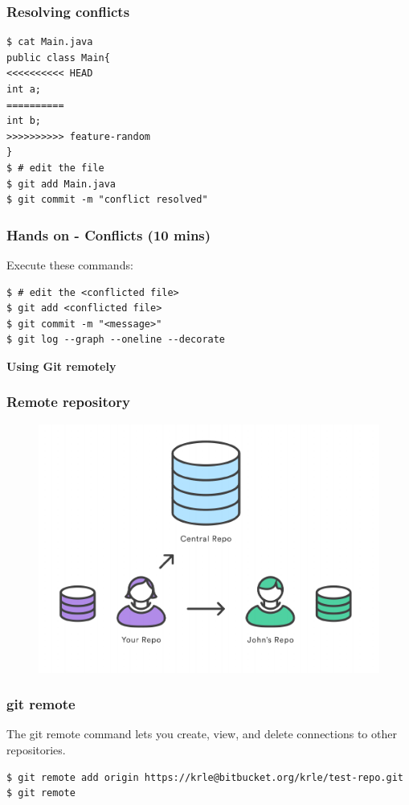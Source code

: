 \documentclass{beamer}
\begin{document}
\begin{frame}[fragile]
\frametitle{Resolving conflicts}
\begin{lstlisting}
$ cat Main.java
public class Main{
<<<<<<<<<< HEAD
int a;
==========
int b;
>>>>>>>>>> feature-random
}
$ # edit the file
$ git add Main.java
$ git commit -m "conflict resolved"
\end{lstlisting}

\end{frame}

\begin{frame}[fragile]
\frametitle{Hands on - Conflicts (10 mins)}

Execute these commands:

\begin{lstlisting}
$ # edit the <conflicted file>
$ git add <conflicted file>
$ git commit -m "<message>"
$ git log --graph --oneline --decorate
\end{lstlisting}
\end{frame}


\begin{frame}
\LARGE	
\textbf{Using Git remotely}
\end{frame}

\begin{frame}
\frametitle{Remote repository}

\begin{figure}
\includegraphics[scale=0.6]{figures/06.pdf}
\end{figure}

\end{frame}


\begin{frame}[fragile]
\frametitle{git remote}

The git remote command lets you create, view, and delete connections
to other repositories.

\begin{lstlisting}
$ git remote add origin https://krle@bitbucket.org/krle/test-repo.git
$ git remote
\end{lstlisting}
\end{frame}
\end{document}
